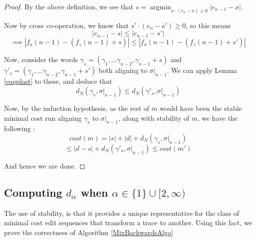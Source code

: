 \documentclass[runningheads]{llncs}
\DeclareMathOperator*{\argmin}{argmin}
\begin{document}
\begin{proof}
By the above definition, we see that $s = \argmin_{x \cdot (e_n - x) \geq 0} {|e_{n-1} - x|}$. 

Now by cross co-operation, we know that $s' \cdot (e_n - s') \geq 0$, so this means $$|e_{n-1} - s| \leq |e_{n-1} - s'| $$$$\implies |f_\sigma(n-1) - (f_\gamma(n-1) + s)| \leq |f_\sigma(n-1) - (f_\gamma(n-1) + s')|$$

Now, consider the words $\gamma_s = (\gamma_1, \dots \gamma_{n-2}, \gamma_{n-1} + s)$ and 
$\gamma'_s = (\gamma_1, \dots \gamma_{n-2}, \gamma_{n-1} + s')$ both aligning to $\sigma|_{n-1}$. We can apply Lemma \ref{cooplast} to these, and deduce that $$d_N(\gamma_s, \sigma|_{n-1}) \leq d_N(\gamma'_s, \sigma|_{n-1})$$

Now, by the induction hypothesis, as the rest of $m$ would have been the stable minimal cost run aligning $\gamma_s$ to $\sigma|_{n-1}$, along with stability of $m$, we have the following : 
$$cost(m) = |s| + |d| + d_N(\gamma_s, \sigma|_{n-1})$$$$ \leq |d-s| + d_N(\gamma'_s, \sigma|_{n-1}) \leq cost(m')$$

And hence we are done. 


\end{proof}

    
\color{firstrevision}
    \subsection{Computing $d_\alpha$ when $\alpha \in \{1\} \cup [2,\infty)$}\label{3}
  
The use of stability, is that it provides a unique representative for the class of minimal cost edit sequences that transform a trace to another. 
Using this fact, we prove the correctness of Algorithm \ref{MixBackwardsAlgo}
\color{black}
  
\end{document}
